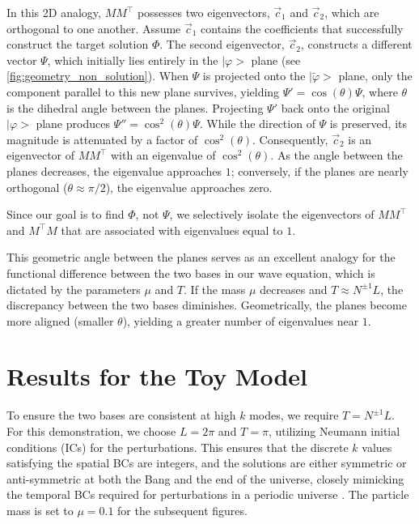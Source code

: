In this 2D analogy, \( MM^\top \) possesses two eigenvectors, \( \vec{c}_1 \) and \( \vec{c}_2 \), which are orthogonal to one another. Assume $\vec{c}_1$ contains the coefficients that successfully construct the target solution $\Phi$. The second eigenvector, $\vec{c}_2$, constructs a different vector \( \Psi \), which initially lies entirely in the \( |\varphi\big> \) plane (see \cref{fig:geometry_non_solution}). When \( \Psi \) is projected onto the \( |\tilde{\varphi}\big> \) plane, only the component parallel to this new plane survives, yielding \( \Psi' = \cos(\theta) \Psi \), where \( \theta \) is the dihedral angle between the planes. Projecting \( \Psi' \) back onto the original \( |\varphi\big> \) plane produces \( \Psi'' = \cos^2(\theta) \Psi \). While the direction of \( \Psi \) is preserved, its magnitude is attenuated by a factor of \( \cos^2(\theta) \). Consequently, \( \vec{c}_2 \) is an eigenvector of \( MM^\top \) with an eigenvalue of \( \cos^2(\theta) \). As the angle between the planes decreases, the eigenvalue approaches $1$; conversely, if the planes are nearly orthogonal (\( \theta \approx \pi/2 \)), the eigenvalue approaches zero.


Since our goal is to find \( \Phi \), not \( \Psi \), we selectively isolate the eigenvectors of \( MM^\top \) and \( M^\top M \) that are associated with eigenvalues equal to $1$.

This geometric angle between the planes serves as an excellent analogy for the functional difference between the two bases in our wave equation, which is dictated by the parameters \( \mu \) and \( T \). If the mass \( \mu \) decreases and $T \approx N^{\pm1}L$, the discrepancy between the two bases diminishes. Geometrically, the planes become more aligned (smaller $\theta$), yielding a greater number of eigenvalues near $1$. 


\section{Results for the Toy Model}\label{sec:toy_model}


To ensure the two bases are consistent at high $k$ modes, we require $T = N^{\pm1}L $. For this demonstration, we choose $L=2\pi$ and $T=\pi$, utilizing Neumann initial conditions (ICs) for the perturbations. This ensures that the discrete $k$ values satisfying the spatial BCs are integers, and the solutions are either symmetric or anti-symmetric at both the Bang and the end of the universe, closely mimicking the temporal BCs required for perturbations in a periodic universe \cite{2022PhRvD.105h3514L}. The particle mass is set to $\mu = 0.1$ for the subsequent figures.

